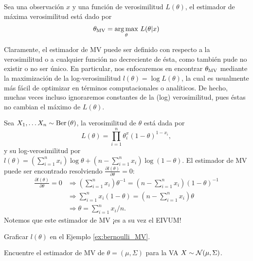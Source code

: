 \begin{definition}
	Sea una observación $x$ y una función de verosimilitud $L(\theta)$, el estimador de máxima verosimilitud está dado por 
	\begin{equation}
		\thetaMV = \underset{\theta}{\arg\max}\ L(\theta|x)
	\end{equation}	
\end{definition}

Claramente, el estimador de MV puede ser definido con respecto a la verosimilitud o a cualquier función no decreciente de ésta, como también pude no existir o no ser único. En particular, nos enfocaremos en encontrar ${\theta_\text{MV}}$ mediante la maximización de la log-verosimilitud $l(\theta) = \log L(\theta)$, la cual es usualmente más fácil de optimizar en términos computacionales o analíticos. De hecho, muchas veces incluso ignoraremos constantes de la (log) verosimilitud, pues éstas no cambian el máximo de $L(\theta)$.

\begin{example}
	\label{ex:bernoulli_MV}
	Sea $X_1,\ldots X_n\sim\text{Ber}\left(\theta\right)$, la verosimilitud de $\theta$ está dada por 
	\begin{equation}
		L(\theta) = \prod_{i=1}^n\theta^x_i(1-\theta)^{1-x_i},
	\end{equation}
	y su log-verosimilitud por $l(\theta) = (\sum_{i=1}^nx_i)\log \theta + (n-\sum_{i=1}^nx_i)\log(1-\theta)$. El estimador de  MV puede ser encontrado resolviendo $\frac{\partial l(\theta)}{\partial \theta} = 0$:
	\begin{align*}
	\frac{\partial l(\theta)}{\partial \theta} =0 
	&\Rightarrow  (\sum_{i=1}^nx_i) \theta^{-1} = (n-\sum_{i=1}^nx_i)(1-\theta)^{-1}\\
	&\Rightarrow  \sum_{i=1}^nx_i (1-\theta) = (n-\sum_{i=1}^nx_i) \theta\\
	&\Rightarrow  \theta = \sum_{i=1}^nx_i/n.
	\end{align*}
Notemos que este estimador de MV ¡es a su vez el EIVUM!	
\end{example}


\begin{exercise}
	Graficar $l(\theta)$ en el Ejemplo \ref{ex:bernoulli_MV}.
\end{exercise}

\begin{exercise}
	Encuentre el estimador de MV de $\theta = (\mu,\Sigma)$ para la VA $X\sim{\mathcal N}(\mu,\Sigma)$.
\end{exercise}

